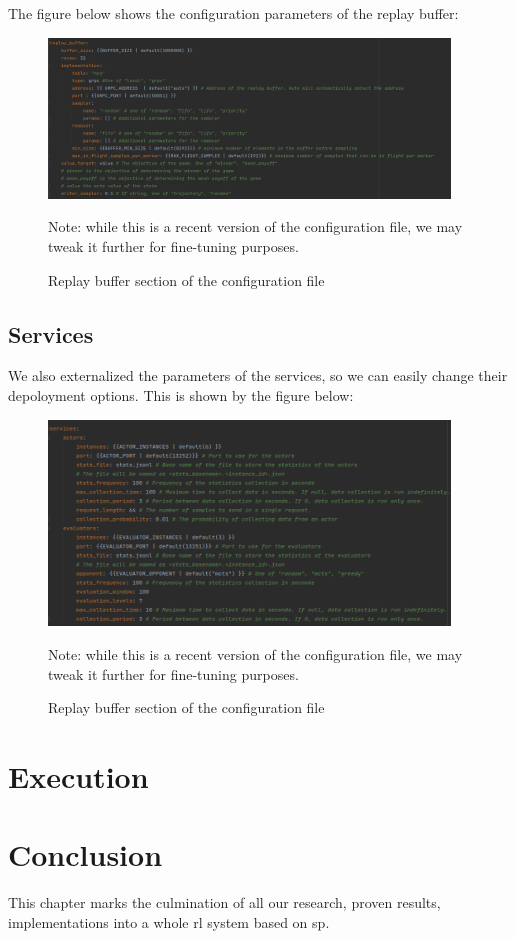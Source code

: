 The figure below shows the configuration parameters of the replay buffer:
\begin{figure}[ht]
	\centering
	\includegraphics[width=0.95\textwidth]{Figures/ReplayBufferConfiguration.png}
	\caption{Replay buffer section of the configuration file \label{fig:ReplayBufferConfiguration.png}}
	\small{Note: while this is a recent version of the configuration file, we may tweak it further for fine-tuning purposes.}
\end{figure}
\FloatBarrier
%
\subsection{Services}
We also externalized the parameters of the services, so we can easily change their depoloyment options. This is shown by the figure below:
\begin{figure}[ht]
	\centering
	\includegraphics[width=0.95\textwidth]{Figures/ServicesConfiguration.png}
	\caption{Replay buffer section of the configuration file \label{fig:ServicesConfiguration.png}}
	\small{Note: while this is a recent version of the configuration file, we may tweak it further for fine-tuning purposes.}
\end{figure}
\FloatBarrier
\section{Execution}
\section*{Conclusion}
This chapter marks the culmination of all our research, proven results, implementations into a whole \acrshort{rl} system based on \acrshort{sp}.

